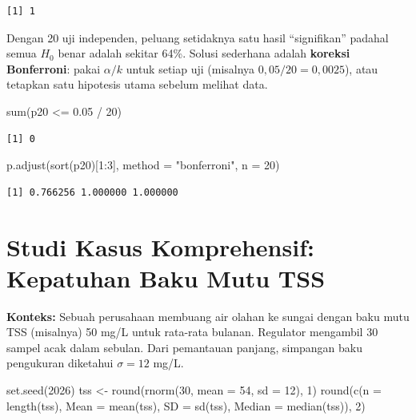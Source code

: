 \documentclass[
  indonesian,
  letterpaper,
]{book}
\newenvironment{Shaded}{\begin{snugshade}}{\end{snugshade}}
\newcommand{\AttributeTok}[1]{\textcolor[rgb]{0.40,0.45,0.13}{#1}}
\newcommand{\DecValTok}[1]{\textcolor[rgb]{0.68,0.00,0.00}{#1}}
\newcommand{\FloatTok}[1]{\textcolor[rgb]{0.68,0.00,0.00}{#1}}
\newcommand{\FunctionTok}[1]{\textcolor[rgb]{0.28,0.35,0.67}{#1}}
\newcommand{\NormalTok}[1]{\textcolor[rgb]{0.00,0.23,0.31}{#1}}
\newcommand{\OtherTok}[1]{\textcolor[rgb]{0.00,0.23,0.31}{#1}}
\newcommand{\SpecialCharTok}[1]{\textcolor[rgb]{0.37,0.37,0.37}{#1}}
\newcommand{\StringTok}[1]{\textcolor[rgb]{0.13,0.47,0.30}{#1}}
\begin{document}
\begin{verbatim}
[1] 1
\end{verbatim}

Dengan 20 uji independen, peluang setidaknya satu hasil ``signifikan''
padahal semua \(H_0\) benar adalah sekitar 64\%. Solusi sederhana adalah
\textbf{koreksi Bonferroni}: pakai \(\alpha/k\) untuk setiap uji
(misalnya \(0{,}05/20 = 0{,}0025\)), atau tetapkan satu hipotesis utama
sebelum melihat data.

\begin{Shaded}
\begin{Highlighting}[]
\FunctionTok{sum}\NormalTok{(p20 }\SpecialCharTok{\textless{}=} \FloatTok{0.05} \SpecialCharTok{/} \DecValTok{20}\NormalTok{)}
\end{Highlighting}
\end{Shaded}

\begin{verbatim}
[1] 0
\end{verbatim}

\begin{Shaded}
\begin{Highlighting}[]
\FunctionTok{p.adjust}\NormalTok{(}\FunctionTok{sort}\NormalTok{(p20)[}\DecValTok{1}\SpecialCharTok{:}\DecValTok{3}\NormalTok{], }\AttributeTok{method =} \StringTok{"bonferroni"}\NormalTok{, }\AttributeTok{n =} \DecValTok{20}\NormalTok{)}
\end{Highlighting}
\end{Shaded}

\begin{verbatim}
[1] 0.766256 1.000000 1.000000
\end{verbatim}


\chapter{Studi Kasus Komprehensif: Kepatuhan Baku Mutu
TSS}\label{studi-kasus-komprehensif-kepatuhan-baku-mutu-tss}

\textbf{Konteks:} Sebuah perusahaan membuang air olahan ke sungai dengan
baku mutu TSS (misalnya) 50 mg/L untuk rata-rata bulanan. Regulator
mengambil 30 sampel acak dalam sebulan. Dari pemantauan panjang,
simpangan baku pengukuran diketahui \(\sigma = 12\) mg/L.

\begin{Shaded}
\begin{Highlighting}[]
\FunctionTok{set.seed}\NormalTok{(}\DecValTok{2026}\NormalTok{)}
\NormalTok{tss }\OtherTok{\textless{}{-}} \FunctionTok{round}\NormalTok{(}\FunctionTok{rnorm}\NormalTok{(}\DecValTok{30}\NormalTok{, }\AttributeTok{mean =} \DecValTok{54}\NormalTok{, }\AttributeTok{sd =} \DecValTok{12}\NormalTok{), }\DecValTok{1}\NormalTok{)}
\FunctionTok{round}\NormalTok{(}\FunctionTok{c}\NormalTok{(}\AttributeTok{n =} \FunctionTok{length}\NormalTok{(tss), }\AttributeTok{Mean =} \FunctionTok{mean}\NormalTok{(tss), }\AttributeTok{SD =} \FunctionTok{sd}\NormalTok{(tss), }\AttributeTok{Median =} \FunctionTok{median}\NormalTok{(tss)), }\DecValTok{2}\NormalTok{)}
\end{Highlighting}
\end{Shaded}
\end{document}
